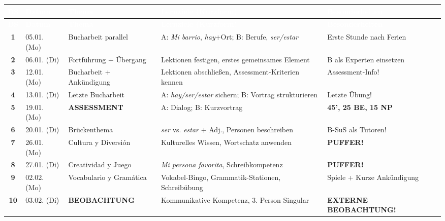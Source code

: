 \documentclass[11pt, a4paper]{article}
\newcommand{\es}[1]{\textcolor{spanisch}{\textit{#1}}}
\begin{document}
\renewcommand{\arraystretch}{1.3}
\small
\begin{longtable}{|c|p{2cm}|p{3.2cm}|p{4cm}|p{4.2cm}|}
\hline
\rowcolor{spanisch}
\textcolor{white}{\textbf{DS}} &
\textcolor{white}{\textbf{Datum}} &
\textcolor{white}{\textbf{Thema}} &
\textcolor{white}{\textbf{Lernziele (Kurzform)}} &
\textcolor{white}{\textbf{Besonderheiten}} \\
\hline
\endfirsthead
\hline
\rowcolor{spanisch}
\textcolor{white}{\textbf{DS}} &
\textcolor{white}{\textbf{Datum}} &
\textcolor{white}{\textbf{Thema}} &
\textcolor{white}{\textbf{Lernziele (Kurzform)}} &
\textcolor{white}{\textbf{Besonderheiten}} \\
\hline
\endhead

\textbf{1} & 05.01. (Mo) & Bucharbeit parallel &
A: \es{Mi barrio}, \es{hay}+Ort; B: Berufe, \es{ser/estar} &
Erste Stunde nach Ferien \\
\hline

\textbf{2} & 06.01. (Di) & Fortführung + Übergang &
Lektionen festigen, erstes gemeinsames Element &
B als Experten einsetzen \\
\hline

\textbf{3} & 12.01. (Mo) & Bucharbeit + Ankündigung &
Lektionen abschließen, Assessment-Kriterien kennen &
\textcolor{assessment}{Assessment-Info!} \\
\hline

\textbf{4} & 13.01. (Di) & Letzte Bucharbeit &
A: \es{hay/ser/estar} sichern; B: Vortrag strukturieren &
\textcolor{assessment}{Letzte Übung!} \\
\hline

\rowcolor{yellow!15}
\textbf{5} & 19.01. (Mo) & \textbf{ASSESSMENT} &
A: Dialog; B: Kurzvortrag &
\textcolor{assessment}{\textbf{45', 25 BE, 15 NP}} \\
\hline

\textbf{6} & 20.01. (Di) & Brückenthema &
\es{ser} vs. \es{estar} + Adj., Personen beschreiben &
\textcolor{gruppeB}{B-SuS als Tutoren!} \\
\hline

\rowcolor{purple!8}
\textbf{7} & 26.01. (Mo) & \textcolor{puffer}{Cultura y Diversión} &
Kulturelles Wissen, Wortschatz anwenden &
\textcolor{puffer}{\textbf{PUFFER!}} \\
\hline

\rowcolor{purple!8}
\textbf{8} & 27.01. (Di) & \textcolor{puffer}{Creatividad y Juego} &
\es{Mi persona favorita}, Schreibkompetenz &
\textcolor{puffer}{\textbf{PUFFER!}} \\
\hline

\textbf{9} & 02.02. (Mo) & Vocabulario y Gramática &
Vokabel-Bingo, Grammatik-Stationen, Schreibübung &
Spiele + Kurze Ankündigung \\
\hline

\rowcolor{red!12}
\textbf{10} & 03.02. (Di) & \textbf{BEOBACHTUNG} &
Kommunikative Kompetenz, 3. Person Singular &
\textcolor{beobachtung}{\textbf{EXTERNE BEOBACHTUNG!}} \\
\hline

\end{longtable}
\end{document}
